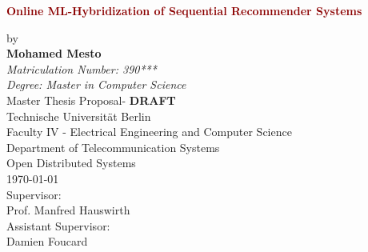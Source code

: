 \begin{titlepage}
\begin{figure}[H]
  \centering
  \vspace*{-1.22cm}
  \hfill
\end{figure}
	\begin{center}
	\vspace{1cm}
		\Huge
		\begin{spacing}{.9}
			\textcolor{DarkRed}{\textbf{Online ML-Hybridization of Sequential Recommender Systems}}\\
		\end{spacing}
		\vspace{0.8cm}
		\large
		by\\
		\vspace{0.8cm} 
		\textbf{Mohamed Mesto}\\
		\vspace{0.8cm} 
		\emph{Matriculation Number: 390***}\\
		\emph{{Degree:} Master in Computer Science}\\
		\vspace{1cm} 
	 	Master Thesis Proposal- \textbf{DRAFT} \\ 
	 	
		\vspace{0.5cm}
		Technische Universität Berlin\\
		Faculty IV - Electrical Engineering and Computer Science\\
		Department of Telecommunication Systems\\
		Open Distributed Systems\\
		\vspace{1.0cm}
		\today\\
		\vspace{1.0cm}
		\large
		Supervisor:\\
		Prof. Manfred Hauswirth\\
		\vspace{1cm}
		Assistant Supervisor:\\
		Damien Foucard
		\end{center}
\end{titlepage}


\newpage

